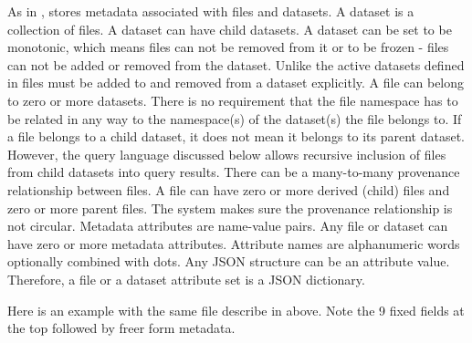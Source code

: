 \documentclass[../main-v1.tex]{subfiles}
\begin{document}
As in ,  stores metadata associated with files and datasets. 
A dataset is a collection of files. A dataset can have child datasets.  A dataset can be set to be monotonic, which means files can not be removed from it or to be frozen - files can not be added or removed from the dataset. 
Unlike the active datasets defined   in  files must be added to and removed from a dataset explicitly. A file can belong to zero or more datasets. There is no requirement that the file namespace has to be related in any way to the namespace(s) of the dataset(s) the file belongs to. If a file belongs to a child dataset, it does not mean it belongs to its parent dataset. However, the query language discussed below allows recursive inclusion of files from child datasets into query results.
There can be a many-to-many provenance relationship between files. A file can have zero or more derived (child) files and zero or more parent files. The system makes sure the provenance relationship is not circular. 
Metadata attributes are name-value pairs. Any file or dataset can have zero or more metadata attributes. Attribute names are alphanumeric words optionally combined with dots. Any JSON structure can be an attribute value. Therefore, a file or a dataset attribute set is a JSON dictionary. 

Here is an example with the same file describe in  above. Note the 9 fixed fields at the top followed by freer form metadata. 
\end{document}
